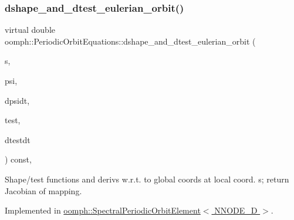 \subsubsection{\texorpdfstring{dshape\+\_\+and\+\_\+dtest\+\_\+eulerian\+\_\+orbit()}{dshape\_and\_dtest\_eulerian\_orbit()}}
{\footnotesize\ttfamily virtual double oomph\+::\+Periodic\+Orbit\+Equations\+::dshape\+\_\+and\+\_\+dtest\+\_\+eulerian\+\_\+orbit (\begin{DoxyParamCaption}\item[{const \hyperlink{classoomph_1_1Vector}{Vector}$<$ double $>$ \&}]{s,  }\item[{\hyperlink{classoomph_1_1Shape}{Shape} \&}]{psi,  }\item[{\hyperlink{classoomph_1_1DShape}{D\+Shape} \&}]{dpsidt,  }\item[{\hyperlink{classoomph_1_1Shape}{Shape} \&}]{test,  }\item[{\hyperlink{classoomph_1_1DShape}{D\+Shape} \&}]{dtestdt }\end{DoxyParamCaption}) const\hspace{0.3cm}{\ttfamily [protected]}, {}}



Shape/test functions and derivs w.\+r.\+t. to global coords at local coord. s; return Jacobian of mapping. 



Implemented in \hyperlink{classoomph_1_1SpectralPeriodicOrbitElement_a09b5fc5cee00d470952242dfea75de69}{oomph\+::\+Spectral\+Periodic\+Orbit\+Element$<$ N\+N\+O\+D\+E\+\_\+D $>$}.

\mbox{\label{classoomph_1_1PeriodicOrbitEquations_a1b818facd1cf315a97176daaa4bc4ee2}} 
